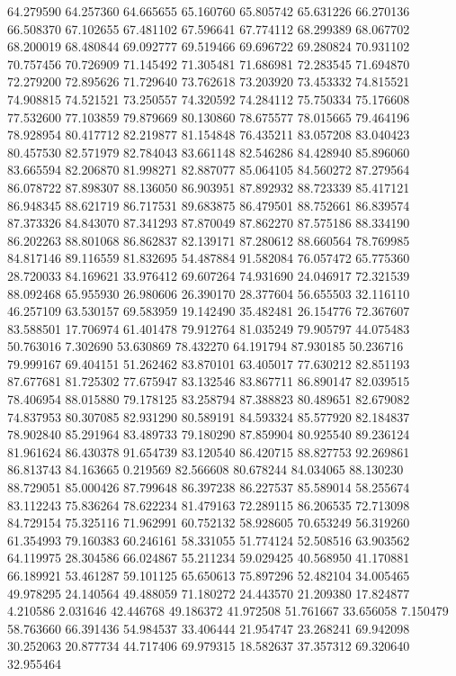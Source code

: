 64.279590
64.257360
64.665655
65.160760
65.805742
65.631226
66.270136
66.508370
67.102655
67.481102
67.596641
67.774112
68.299389
68.067702
68.200019
68.480844
69.092777
69.519466
69.696722
69.280824
70.931102
70.757456
70.726909
71.145492
71.305481
71.686981
72.283545
71.694870
72.279200
72.895626
71.729640
73.762618
73.203920
73.453332
74.815521
74.908815
74.521521
73.250557
74.320592
74.284112
75.750334
75.176608
77.532600
77.103859
79.879669
80.130860
78.675577
78.015665
79.464196
78.928954
80.417712
82.219877
81.154848
76.435211
83.057208
83.040423
80.457530
82.571979
82.784043
83.661148
82.546286
84.428940
85.896060
83.665594
82.206870
81.998271
82.887077
85.064105
84.560272
87.279564
86.078722
87.898307
88.136050
86.903951
87.892932
88.723339
85.417121
86.948345
88.621719
86.717531
89.683875
86.479501
88.752661
86.839574
87.373326
84.843070
87.341293
87.870049
87.862270
87.575186
88.334190
86.202263
88.801068
86.862837
82.139171
87.280612
88.660564
78.769985
84.817146
89.116559
81.832695
54.487884
91.582084
76.057472
65.775360
28.720033
84.169621
33.976412
69.607264
74.931690
24.046917
72.321539
88.092468
65.955930
26.980606
26.390170
28.377604
56.655503
32.116110
46.257109
63.530157
69.583959
19.142490
35.482481
26.154776
72.367607
83.588501
17.706974
61.401478
79.912764
81.035249
79.905797
44.075483
50.763016
7.302690
53.630869
78.432270
64.191794
87.930185
50.236716
79.999167
69.404151
51.262462
83.870101
63.405017
77.630212
82.851193
87.677681
81.725302
77.675947
83.132546
83.867711
86.890147
82.039515
78.406954
88.015880
79.178125
83.258794
87.388823
80.489651
82.679082
74.837953
80.307085
82.931290
80.589191
84.593324
85.577920
82.184837
78.902840
85.291964
83.489733
79.180290
87.859904
80.925540
89.236124
81.961624
86.430378
91.654739
83.120540
86.420715
88.827753
92.269861
86.813743
84.163665
0.219569
82.566608
80.678244
84.034065
88.130230
88.729051
85.000426
87.799648
86.397238
86.227537
85.589014
58.255674
83.112243
75.836264
78.622234
81.479163
72.289115
86.206535
72.713098
84.729154
75.325116
71.962991
60.752132
58.928605
70.653249
56.319260
61.354993
79.160383
60.246161
58.331055
51.774124
52.508516
63.903562
64.119975
28.304586
66.024867
55.211234
59.029425
40.568950
41.170881
66.189921
53.461287
59.101125
65.650613
75.897296
52.482104
34.005465
49.978295
24.140564
49.488059
71.180272
24.443570
21.209380
17.824877
4.210586
2.031646
42.446768
49.186372
41.972508
51.761667
33.656058
7.150479
58.763660
66.391436
54.984537
33.406444
21.954747
23.268241
69.942098
30.252063
20.877734
44.717406
69.979315
18.582637
37.357312
69.320640
32.955464

